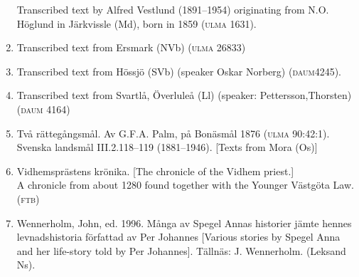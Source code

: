 \begin{enumerate}
Transcribed text by Alfred Vestlund (1891--1954) originating from N.O. Höglund in Järkvissle (Md), born in 1859 (\textsc{ulma} 1631).


\item[\sqbrSenum]

\label{bkm:Ref137880753}Transcribed text from Ersmark (NVb) (\textsc{ulma} 26833) 


\item[\sqbrSenum]

\label{bkm:Ref137882624}Transcribed text from Hössjö (SVb) (speaker Oskar Norberg) (\textsc{daum}4245).


\item[\sqbrSenum]

\label{bkm:Ref137880773}Transcribed text from Svartlå, Överluleå (Ll) (speaker: Pettersson,Thorsten) (\textsc{daum} 4164)


\item[\sqbrSenum]

\label{bkm:Ref154203986}Två rättegångsmål. Av G.F.A. Palm, på Bonäsmål 1876 (\textsc{ulma} 90:42:1). Svenska landsmål III.2.118--119 (1881--1946). [Texts from Mora (Os)]

\item[\sqbrSenum]

\label{bkm:Ref137879614}\label{bkm:Ref261512115}Vidhemsprästens krönika. [The chronicle of the Vidhem priest.]\\
A chronicle from about 1280 found together with the Younger Västgöta Law. (\textsc{ftb}) 

\item[\sqbrSenum]

\label{bkm:Ref150067493}\label{bkm:Ref150327539}Wennerholm, John, ed. 1996. Många av Spegel Annas historier jämte hennes levnadshistoria författad av Per Johannes [Various stories by Spegel Anna and her life-story told by Per Johannes]. Tällnäs: J. Wennerholm. (Leksand Ns). 


\end{enumerate}

